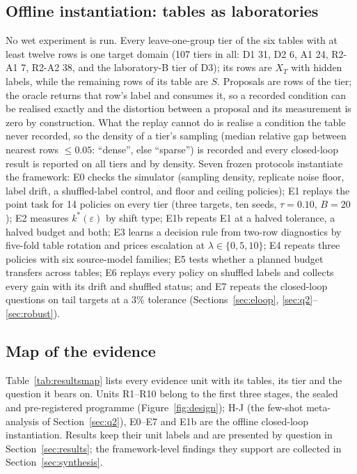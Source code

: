 \documentclass[11pt,a4paper]{article}
\begin{document}
\subsection{Offline instantiation: tables as laboratories}
\label{sec:fw-offline}
No wet experiment is run. Every leave-one-group tier of the six tables with
at least twelve rows is one target domain (107 tiers in all: D1 31, D2 6,
A1 24, R2-A1 7, R2-A2 38, and the laboratory-B tier of D3); its rows are
$X_T$ with hidden labels, while the remaining rows of its table are $S$.
Proposals are rows of the tier; the oracle returns that row's label and
consumes it, so a recorded condition can be realised exactly and the
distortion between a proposal and its measurement is zero by construction.
What the replay cannot do is realise a condition the table never recorded, so
the density of a tier's sampling (median relative gap between nearest rows
$\le 0.05$: ``dense'', else ``sparse'') is recorded and every closed-loop
result is reported on all tiers and by density. Seven frozen protocols instantiate the framework:
E0 checks the simulator (sampling density, replicate noise floor, label
drift, a shuffled-label control, and floor and ceiling policies); E1 replays
the point task for 14 policies on every tier (three targets, ten seeds,
$\tau = 0.10$, $B = 20$); E2 measures $k^{*}(\varepsilon)$ by shift type; E1b
repeats E1 at a halved tolerance, a halved budget and both; E3 learns a decision
rule from two-row diagnostics by five-fold table rotation and prices
escalation at $\lambda \in \{0, 5, 10\}$; E4 repeats three policies with six
source-model families; E5 tests whether a planned budget transfers across
tables; E6 replays every policy on shuffled labels and collects every gain with
its drift and shuffled status; and E7 repeats the closed-loop questions on tail
targets at a 3\% tolerance (Sections~\ref{sec:eloop},
\ref{sec:q2}--\ref{sec:robust}).

\subsection{Map of the evidence}
\label{sec:fw-map}
Table~\ref{tab:resultsmap} lists every evidence unit with its tables, its
tier and the question it bears on. Units R1--R10 belong to the first three stages, the
sealed and pre-registered programme (Figure~\ref{fig:design}); H-J (the
few-shot meta-analysis of Section~\ref{sec:q2}), E0--E7 and E1b are the
offline closed-loop instantiation. Results keep their unit
labels and are presented by question in Section~\ref{sec:results}; the
framework-level findings they support are collected in
Section~\ref{sec:synthesis}.
\end{document}
